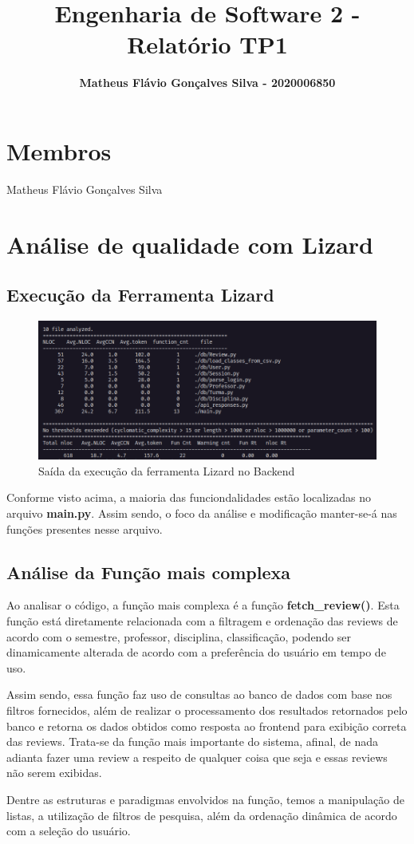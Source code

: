 \documentclass[12pt]{article}
\title{\textbf{Engenharia de Software 2 - Relatório TP1}}
\author{\textbf{Matheus Flávio Gonçalves Silva - 2020006850}}
\date{\parbox{\linewidth}{\centering%
		Universidade Federal de Minas Gerais (UFMG)\endgraf
		Belo Horizonte - MG - Brasil\endgraf\bigskip
		\href{mailto:matheusfgs@ufmg.br}{matheusfgs@ufmg.br}}}
\begin{document}
	
	\maketitle
	
	
	\section {Membros}
	Matheus Flávio Gonçalves Silva
	
	
	\section{Análise de qualidade com Lizard}
	\subsection{Execução da Ferramenta Lizard}
	\begin{figure}[h]
		\includegraphics[scale=0.52]{Figure1.png}
		\caption{Saída da execução da ferramenta Lizard no Backend}	
	\end{figure}
	\par Conforme visto acima, a maioria das funciondalidades estão localizadas no arquivo \textbf{main.py}. Assim sendo, o foco da análise e modificação manter-se-á nas funções presentes nesse arquivo.
	
	\subsection{Análise da Função mais complexa}
	\par Ao analisar o código, a função mais complexa é a função \textbf{fetch\_review()}. Esta função está diretamente relacionada com a filtragem e ordenação das reviews de acordo com o semestre, professor, disciplina, classificação, podendo ser dinamicamente alterada de acordo com a preferência do usuário em tempo de uso.
	\par Assim sendo, essa função faz uso de consultas ao banco de dados com base nos filtros fornecidos, além de realizar o processamento dos resultados retornados pelo banco e retorna os dados obtidos como resposta ao frontend para exibição correta das reviews. Trata-se da função mais importante do sistema, afinal, de nada adianta fazer uma review a respeito de qualquer coisa que seja e essas reviews não serem exibidas.
	\par Dentre as estruturas e paradigmas envolvidos na função, temos a manipulação de listas, a utilização de filtros de pesquisa, além da ordenação dinâmica de acordo com a seleção do usuário.
	
\end{document}

